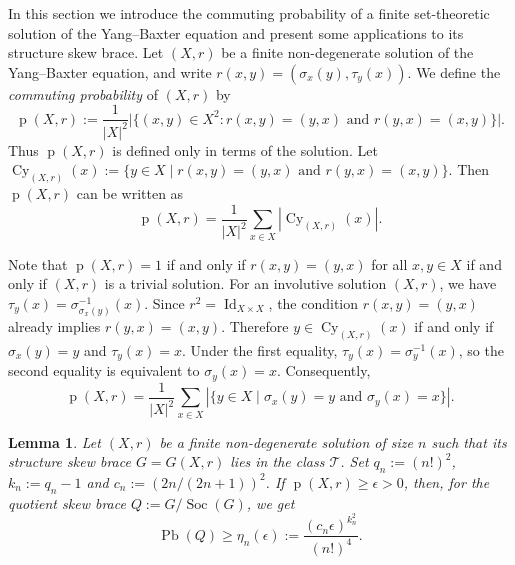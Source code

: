\documentclass[11pt, oneside]{amsart}
\numberwithin{equation}{section}
\theoremstyle{plain}
\newtheorem{lem}[equation]{Lemma}
\theoremstyle{definition}
\newcommand{\Cy}{\operatorname{Cy} }
\newcommand{\Pb}{\operatorname{Pb} }
\newcommand{\Id}{\operatorname{Id}}
\newcommand{\Soc}{\operatorname{Soc} }
\begin{document}
In this section we introduce the commuting probability of a finite set-theoretic solution of the Yang--Baxter equation and present some applications  to its structure skew brace. Let $(X,r)$ be a finite non-degenerate solution of the Yang--Baxter equation, and write
$r(x,y)=(\sigma_x(y),\tau_y(x))$.  We define the
\emph{commuting probability} of $(X,r)$ by
$$\operatorname{p}(X,r) :=\frac{1}{|X|^2}
\big|\{(x,y)\in X^2:r(x,y)=(y,x)\text{ and }r(y,x)=(x,y)\}\big|.
$$
Thus $\operatorname{p}(X,r)$ is defined only in terms of the solution. Let $\Cy_{(X,r)}(x) :=\{y\in X\mid r(x,y)=(y,x)\text{ and }r(y,x)=(x,y)\}$. Then $\operatorname{p}(X,r)$ can be written as 
$$\operatorname{p}(X,r) =\frac{1}{|X|^2}\sum_{x\in X}|\Cy_{(X,r)}(x)|.
$$

Note that $\operatorname{p}(X,r)=1$ if and only if $r(x,y)=(y,x)$ for all $x,y\in X$ if and only if $(X, r)$ is a trivial solution. 
For an involutive solution $(X,r)$, we have
$\tau_y(x)=\sigma^{-1}_{\sigma_x(y)}(x)$. Since $r^2=\Id_{X\times X}$, the condition
$r(x,y)=(y,x)$ already implies $r(y,x)=(x,y)$. Therefore
$y\in\Cy_{(X,r)}(x)$ if and only if
$\sigma_x(y)=y$ and $\tau_y(x)=x$. Under the first equality,
$\tau_y(x)=\sigma_y^{-1}(x)$, so the second equality is equivalent to
$\sigma_y(x)=x$. Consequently,
$$
\operatorname{p}(X,r)=\frac{1}{|X|^2}\sum_{x\in X}
|\{y\in X\mid \sigma_x(y)=y\text{ and }\sigma_y(x)=x\}|.
$$



\begin{lem}\label{lem:ybe-rn2-local-global}
Let $(X,r)$ be a finite non-degenerate solution of size $n$ such that its structure skew brace $G=G(X,r)$ lies in the class $\mathcal{T}$. Set
$q_n := (n!)^2$, $k_n := q_n-1$ and $c_n := (2n/(2n+1))^2$. If
$\operatorname{p}(X,r)\geqslant\epsilon>0$, then, for the quotient skew brace $Q := G/\Soc(G)$, we get
$$
\Pb(Q)\geqslant\eta_n(\epsilon):=
\frac{(c_n\epsilon)^{k_n^2}}{(n!)^4}.
$$
\end{lem}
\end{document}
